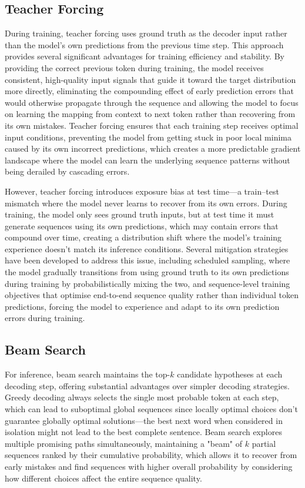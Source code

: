 \subsection{Teacher Forcing}

During training, teacher forcing uses ground truth as the decoder input rather than the model's own predictions from the previous time step. This approach provides several significant advantages for training efficiency and stability. By providing the correct previous token during training, the model receives consistent, high-quality input signals that guide it toward the target distribution more directly, eliminating the compounding effect of early prediction errors that would otherwise propagate through the sequence and allowing the model to focus on learning the mapping from context to next token rather than recovering from its own mistakes. Teacher forcing ensures that each training step receives optimal input conditions, preventing the model from getting stuck in poor local minima caused by its own incorrect predictions, which creates a more predictable gradient landscape where the model can learn the underlying sequence patterns without being derailed by cascading errors.

However, teacher forcing introduces exposure bias at test time—a train–test mismatch where the model never learns to recover from its own errors. During training, the model only sees ground truth inputs, but at test time it must generate sequences using its own predictions, which may contain errors that compound over time, creating a distribution shift where the model's training experience doesn't match its inference conditions. Several mitigation strategies have been developed to address this issue, including scheduled sampling, where the model gradually transitions from using ground truth to its own predictions during training by probabilistically mixing the two, and sequence-level training objectives that optimise end-to-end sequence quality rather than individual token predictions, forcing the model to experience and adapt to its own prediction errors during training.

\subsection{Beam Search}

For inference, beam search maintains the top-$k$ candidate hypotheses at each decoding step, offering substantial advantages over simpler decoding strategies. Greedy decoding always selects the single most probable token at each step, which can lead to suboptimal global sequences since locally optimal choices don't guarantee globally optimal solutions—the best next word when considered in isolation might not lead to the best complete sentence. Beam search explores multiple promising paths simultaneously, maintaining a "beam" of $k$ partial sequences ranked by their cumulative probability, which allows it to recover from early mistakes and find sequences with higher overall probability by considering how different choices affect the entire sequence quality.

